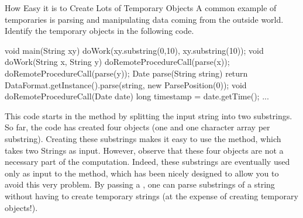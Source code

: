 
\begin{example}{How Easy it is to Create Lots of Temporary Objects}
A common example of temporaries is parsing
and manipulating data coming from the outside world. Identify the temporary
objects in the following code.

\begin{shortlisting}%
void main(String xy) {
	doWork(xy.substring(0,10), xy.substring(10));
}	
void doWork(String x, String y) {
	doRemoteProcedureCall(parse(x));
	doRemoteProcedureCall(parse(y));
}
Date parse(String string) {
	return DataFormat.getInstance().parse(string, new ParsePosition(0));
}
void doRemoteProcedureCall(Date date) {
	long timestamp = date.getTime();
	...
}
\end{shortlisting}
\end{example} 

This code starts in the  method by splitting the input string into two
substrings. So far, the code has created four objects (one  and one
character array per substring). Creating these substrings makes it easy to use
the  method, which takes two Strings as input. However, observe that
these four objects are not a necessary part of the computation. Indeed, these
substrings are eventually used only as input to the 
 method, which has been nicely designed to allow you to avoid this
very problem. By passing a , one can parse substrings of a
string without having to create temporary strings (at the expense of creating
temporary  objects!).




